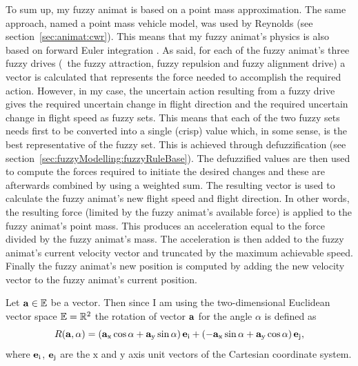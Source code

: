 To sum up, my fuzzy animat is based on a point mass approximation. The same approach, named a point mass vehicle model, was used by Reynolds \cite{reynolds:1987,reynolds:1999} (see section~\ref{sec:animat:cwr}). This means that my fuzzy animat's physics is also based on forward Euler integration \cite{parent:2002,reynolds:1999}. As said, for each of the fuzzy animat's three fuzzy drives (\ie\ the fuzzy attraction, fuzzy repulsion and fuzzy alignment drive) a vector is calculated that represents the force needed to accomplish the required action. However, in my case, the uncertain action resulting from a fuzzy drive gives the required uncertain change in flight direction and the required uncertain change in flight speed as fuzzy sets. This means that each of the two fuzzy sets needs first to be converted into a single (crisp) value which, in some sense, is the best representative of the fuzzy set. This is achieved through defuzzification (see section~\ref{sec:fuzzyModelling:fuzzyRuleBase}). The defuzzified values are then used to compute the forces required to initiate the desired changes and these are afterwards combined by using a weighted sum.  The resulting vector is used to calculate the fuzzy animat's new flight speed and flight direction. In other words, the resulting force (limited by the fuzzy animat's available force) is applied to the fuzzy animat's point mass. This produces an acceleration equal to the force divided by the fuzzy animat's mass. The acceleration is then added to the fuzzy animat's current velocity vector and truncated by the maximum achievable speed. Finally the fuzzy animat's new position is computed by adding the new velocity vector to the fuzzy animat's current position. 

Let ${\mathbf{a}} \in \mathbb{E}$ be a vector. Then since I am using the two-dimensional Euclidean vector space $\mathbb{E}=\mathbb{R}^2$ the rotation of vector ${\mathbf{a}}$ for the angle $\alpha$ is defined as
%
\begin{equation}
R({\mathbf{a}}, \alpha) = \left({\mathbf{a}}_\mathrm{x}\cos\alpha + {\mathbf{a}}_\mathrm{y}\sin\alpha\right){\mathbf{e}}_\mathrm{i} + \left(-{\mathbf{a}}_\mathrm{x}\sin\alpha + {\mathbf{a}}_\mathrm{y}\cos\alpha\right){\mathbf{e}}_\mathrm{j},
\end{equation}
%
where ${\mathbf{e}}_\mathrm{i}$, ${\mathbf{e}}_\mathrm{j}$ are the $\mathrm{x}$ and $\mathrm{y}$ axis unit vectors of the Cartesian coordinate system.

